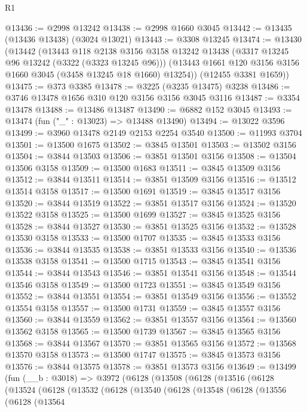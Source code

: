 \begin{lexlean}{R1}
\begin{coremodule}
@13436 := @2998 @13242
@13438 := @2998 @1660 @3045
@13442 := @13435 (@13436 @13438) (@3024 @13021)
@13443 := @3308 @13245
@13474 := @13430
    (@13442
      (@13443
        @118
        @2138
        @3156
        @3158
        @13242
        @13438
        (@3317 @13245 @96 @13242 (@3322 (@3323 @13245 @96)))
        (@13443 @1661 @120 @3156 @3156 @1660 @3045 (@3458 @13245 @18 @1660) @13254))
      (@12455 @3381 @1659))
@13475 := @373 @3385
@13478 := @3225 (@3235 @13475) @3238
@13486 := @3746 @13478 @1656 @310 @120 @3156 @3156 @3045 @3116
@13487 := @3354 @13478
@13488 := @13486 @13487
@13490 := @6882 @152 @3045
@13493 := @13474 (fun ("_" : @13023) => @13488 @13490)
@13494 := @13022 @3596
@13499 := @3960 @13478 @2149 @2153 @2254 @3540
@13500 := @11993 @3704
@13501 := @13500 @1675
@13502 := @3845 @13501
@13503 := @13502 @3156
@13504 := @3844 @13503
@13506 := @3851 @13501 @3156
@13508 := @13504 @13506 @3158
@13509 := @13500 @1683
@13511 := @3845 @13509 @3156
@13512 := @3844 @13511
@13514 := @3851 @13509 @3156
@13516 := @13512 @13514 @3158
@13517 := @13500 @1691
@13519 := @3845 @13517 @3156
@13520 := @3844 @13519
@13522 := @3851 @13517 @3156
@13524 := @13520 @13522 @3158
@13525 := @13500 @1699
@13527 := @3845 @13525 @3156
@13528 := @3844 @13527
@13530 := @3851 @13525 @3156
@13532 := @13528 @13530 @3158
@13533 := @13500 @1707
@13535 := @3845 @13533 @3156
@13536 := @3844 @13535
@13538 := @3851 @13533 @3156
@13540 := @13536 @13538 @3158
@13541 := @13500 @1715
@13543 := @3845 @13541 @3156
@13544 := @3844 @13543
@13546 := @3851 @13541 @3156
@13548 := @13544 @13546 @3158
@13549 := @13500 @1723
@13551 := @3845 @13549 @3156
@13552 := @3844 @13551
@13554 := @3851 @13549 @3156
@13556 := @13552 @13554 @3158
@13557 := @13500 @1731
@13559 := @3845 @13557 @3156
@13560 := @3844 @13559
@13562 := @3851 @13557 @3156
@13564 := @13560 @13562 @3158
@13565 := @13500 @1739
@13567 := @3845 @13565 @3156
@13568 := @3844 @13567
@13570 := @3851 @13565 @3156
@13572 := @13568 @13570 @3158
@13573 := @13500 @1747
@13575 := @3845 @13573 @3156
@13576 := @3844 @13575
@13578 := @3851 @13573 @3156
@13649 := @13499
    (fun (__b : @3018) =>
    @3972
      (@6128
        (@13508
          (@6128
            (@13516
              (@6128
                (@13524
                  (@6128
                    (@13532
                      (@6128
                        (@13540
                          (@6128
                            (@13548
                              (@6128
                                (@13556
                                  (@6128
                                    (@13564

\end{coremodule}
\end{lexlean}
